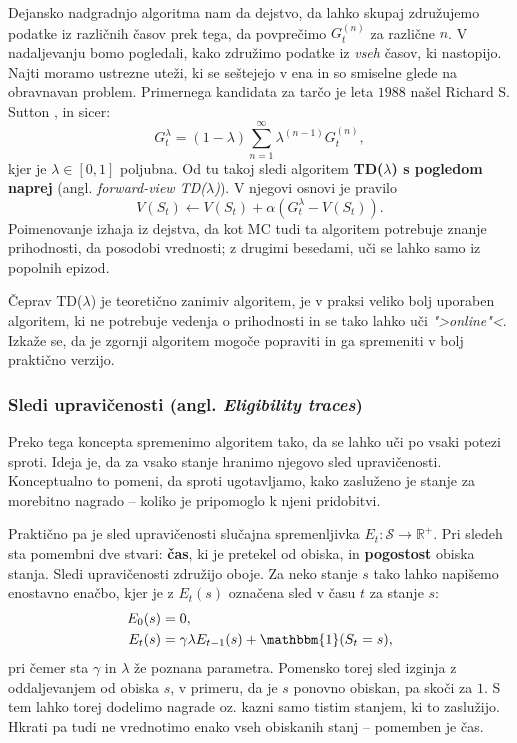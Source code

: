 \documentclass[12pt,a4paper]{amsart}
\theoremstyle{definition} %
\theoremstyle{plain} %
\begin{document}
Dejansko nadgradnjo algoritma nam da dejstvo, da lahko skupaj združujemo podatke iz različnih časov 
prek tega, da povprečimo $G_t^{(n)}$ za različne $n$. V nadaljevanju bomo pogledali, kako združimo 
podatke iz \textit{vseh} časov, ki nastopijo. Najti moramo ustrezne uteži, ki se seštejejo v ena in so 
smiselne glede na obravnavan problem. Primernega kandidata za tarčo je leta $1988$ našel Richard S. 
Sutton \cite{TDlambda}, in sicer:
$$
G_t^\lambda = (1 - \lambda) \sum_{n=1}^\infty \lambda^{(n-1)} G_t^{(n)},
$$
kjer je $\lambda \in [0, 1]$ poljubna. Od tu takoj sledi algoritem \textbf{TD($\lambda$) s pogledom 
naprej} (angl. \textit{forward-view TD($\lambda$)}). V njegovi osnovi je pravilo 
$$
V(S_t) \leftarrow V(S_t) + \alpha (G_t^\lambda - V(S_t)).
$$ 
Poimenovanje izhaja iz dejstva, da kot MC tudi ta algoritem potrebuje znanje prihodnosti, da posodobi 
vrednosti; z drugimi besedami, uči se lahko samo iz popolnih epizod.

Čeprav TD($\lambda$) je teoretično zanimiv algoritem, je v praksi veliko bolj uporaben algoritem, 
ki ne potrebuje vedenja o prihodnosti in se tako lahko uči \textit{">online"<}. Izkaže se, da je 
zgornji algoritem mogoče popraviti in ga spremeniti v bolj praktično verzijo.

\subsubsection{Sledi upravičenosti (angl. \textit{Eligibility traces})}
Preko tega koncepta spremenimo algoritem tako, da se lahko uči po vsaki potezi sproti. Ideja 
je, da za vsako stanje hranimo njegovo sled upravičenosti. Konceptualno to pomeni, da sproti 
ugotavljamo, kako zasluženo je stanje za morebitno nagrado -- koliko je pripomoglo k njeni 
pridobitvi.

Praktično pa je sled upravičenosti slučajna spremenljivka $E_t: \mathcal{S} \rightarrow \mathbb{R}^+$. 
Pri sledeh sta pomembni dve stvari: \textbf{čas}, ki je pretekel od obiska, in \textbf{pogostost} 
obiska stanja. Sledi upravičenosti združijo oboje. Za neko stanje $s$ tako lahko napišemo enostavno 
enačbo, kjer je z $E_t(s)$ označena sled v času $t$ za stanje $s$:
\begin{align*}
    E_0(s) &= 0, \\
    E_t(s) &= \gamma \lambda E_{t-1}(s) + \mathbbm{1}(S_t = s),
\end{align*}
pri čemer sta $\gamma$ in $\lambda$ že poznana parametra. Pomensko torej sled izginja z oddaljevanjem 
od obiska $s$, v primeru, da je $s$ ponovno obiskan, pa skoči za $1$. S tem lahko torej dodelimo 
nagrade oz. kazni samo tistim stanjem, ki to zaslužijo. Hkrati pa tudi ne vrednotimo enako vseh 
obiskanih stanj -- pomemben je čas.
\end{document}

